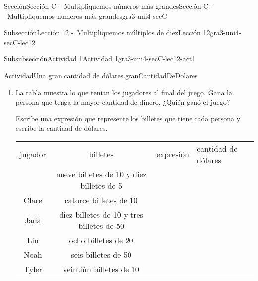 \documentclass[twoside,14pt,]{extarticle}
\newcommand{\tabularfont}{\relax}
\newcommand{\hrulethick} {\noalign{\hrule height 0.11em}}
\begin{document}
\begin{sectionptx}{Sección}{Sección C -~Multipliquemos números más grandes}{}{Sección C -~Multipliquemos números más grandes}{}{}{gra3-uni4-secC}
\begin{subsectionptx}{Subsección}{Lección 12 -~Multipliquemos múltiplos de diez}{}{Lección 12}{}{}{gra3-uni4-secC-lec12}
\begin{subsubsectionptx}{Subsubsección}{Actividad 1}{}{Actividad 1}{}{}{gra3-uni4-secC-lec12-act1}
\begin{activity}{Actividad}{Una gran cantidad de dólares.}{granCantidadDeDolares}
\begin{enumerate}
\begin{enumerate}
\item{}Escribe una expresión para cada forma en la que Noah podría haberle pagado a Lin.%
\end{enumerate}
\item{}La tabla muestra lo que tenían los jugadores al final del juego. Gana la persona que tenga la mayor cantidad de dinero. ¿Quién ganó el juego?%
\par
Escribe una expresión que represente los billetes que tiene cada persona y escribe la cantidad de dólares.%
\begin{center}%
{\tabularfont%
\begin{tabular}{ccll}
\multicolumn{1}{m{0.15\linewidth}}{\centering%
jugador%
}&\multicolumn{1}{m{0.35\linewidth}}{\centering%
billetes%
}&\multicolumn{1}{m{0.25\linewidth}}{\raggedright%
expresión%
}&\multicolumn{1}{m{0.25\linewidth}}{\raggedright%
cantidad de dólares%
}\tabularnewline\hrulethick
\multicolumn{1}{m{0.15\linewidth}}{\centering%
Andre%
}&\multicolumn{1}{m{0.35\linewidth}}{\centering%
nueve billetes de \textdollar{}10 y diez billetes de \textdollar{}5%
}&\multicolumn{1}{m{0.25\linewidth}}{\raggedright%
%
}&\multicolumn{1}{m{0.25\linewidth}}{\raggedright%
%
}\tabularnewline[0pt]
\multicolumn{1}{m{0.15\linewidth}}{\centering%
Clare%
}&\multicolumn{1}{m{0.35\linewidth}}{\centering%
catorce billetes de \textdollar{}10%
}&\multicolumn{1}{m{0.25\linewidth}}{\raggedright%
%
}&\multicolumn{1}{m{0.25\linewidth}}{\raggedright%
%
}\tabularnewline[0pt]
\multicolumn{1}{m{0.15\linewidth}}{\centering%
Jada%
}&\multicolumn{1}{m{0.35\linewidth}}{\centering%
diez billetes de \textdollar{}10 y tres billetes de \textdollar{}50%
}&\multicolumn{1}{m{0.25\linewidth}}{\raggedright%
%
}&\multicolumn{1}{m{0.25\linewidth}}{\raggedright%
%
}\tabularnewline[0pt]
\multicolumn{1}{m{0.15\linewidth}}{\centering%
Lin%
}&\multicolumn{1}{m{0.35\linewidth}}{\centering%
ocho billetes de \textdollar{}20%
}&\multicolumn{1}{m{0.25\linewidth}}{\raggedright%
%
}&\multicolumn{1}{m{0.25\linewidth}}{\raggedright%
%
}\tabularnewline[0pt]
\multicolumn{1}{m{0.15\linewidth}}{\centering%
Noah%
}&\multicolumn{1}{m{0.35\linewidth}}{\centering%
seis billetes de \textdollar{}50%
}&\multicolumn{1}{m{0.25\linewidth}}{\raggedright%
%
}&\multicolumn{1}{m{0.25\linewidth}}{\raggedright%
%
}\tabularnewline[0pt]
\multicolumn{1}{m{0.15\linewidth}}{\centering%
Tyler%
}&\multicolumn{1}{m{0.35\linewidth}}{\centering%
veintiún billetes de \textdollar{}10%
}&\multicolumn{1}{m{0.25\linewidth}}{\raggedright%
%
}&\multicolumn{1}{m{0.25\linewidth}}{\raggedright%
%
}
\end{tabular}
}
\end{center}
\end{enumerate}
\end{activity}
\end{subsubsectionptx}
\end{subsectionptx}
\end{sectionptx}
\end{document}
